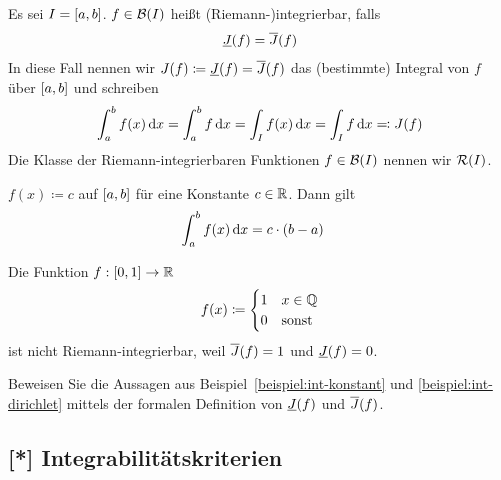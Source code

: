 \begin{definition}[Integral]
    Es sei $I=\left[a,b\right]$. $f\in \mB\of{I}$ heißt (Riemann-)integrierbar, falls
    \begin{align*}
        \underline{J}\of{f} = \overline{J}\of{f}
    \end{align*}
    In diese Fall nennen wir $J(f) \coloneqq \underline{J}\of{f} = \overline{J}\of{f}$ das (bestimmte) Integral von $f$ über $\left[a,b\right]$ und schreiben
    \begin{align*}
        \int_{a}^{b} f(x) \mathop{}\!\mathrm{d} x = \int_{a}^{b} f\mathop{}\!\mathrm{d} x = \int_{I} f(x)\mathop{}\!\mathrm{d} x = \int_{I} f\mathop{}\!\mathrm{d} x \eqqcolon J(f)
    \end{align*}
    Die Klasse der Riemann-integrierbaren Funktionen $f\in \mB\of{I}$ nennen wir $\mR\of{I}$.
\end{definition}

\begin{beispiel}
    \marginnote{[18. Apr]}
    \label{beispiel:int-konstant}
    $f(x) \coloneqq c$ auf $\left[a,b\right]$ für eine Konstante $c\in\mathbb{R}$. Dann gilt
    \begin{align*}
        \int_{a}^{b} f\of{x} \dif x &= c\cdot\pair{b-a}
    \end{align*}
\end{beispiel}

\begin{beispiel}
    \label{beispiel:int-dirichlet}
    Die Funktion $f: \left[0,1\right]\rightarrow{}\mathbb{R}$
    \begin{align*}
        f(x) \coloneqq \begin{cases}
                           1 &x\in \mathbb{Q}\\
                           0 &\text{sonst}
        \end{cases}
    \end{align*}
    ist nicht Riemann-integrierbar, weil $\overline{J}\of{f} = 1$ und $\underline{J}\of{f} = 0$.
\end{beispiel}

\begin{uebung}
    Beweisen Sie die Aussagen aus Beispiel~\ref{beispiel:int-konstant} und \ref{beispiel:int-dirichlet} mittels der formalen Definition von $\un{J}\of{f}$ und $\ov{J}\of{f}$.
\end{uebung}

\subsection{[*] Integrabilitätskriterien}

